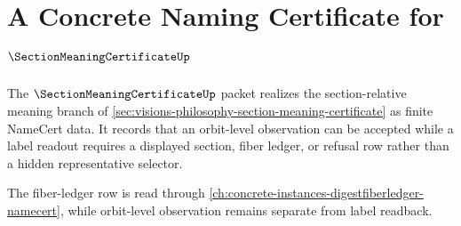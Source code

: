 \chapter{A Concrete Naming Certificate for $\SectionMeaningCertificateUp$}
\label{ch:concrete-instances-section-meaning-certificate-namecert}

The $\SectionMeaningCertificateUp$ packet realizes the section-relative meaning branch of \autoref{sec:visions-philosophy-section-meaning-certificate} as finite NameCert data. It records that an orbit-level observation can be accepted while a label readout requires a displayed section, fiber ledger, or refusal row rather than a hidden representative selector.

The fiber-ledger row is read through \autoref{ch:concrete-instances-digestfiberledger-namecert}, while orbit-level observation remains separate from label readback.


